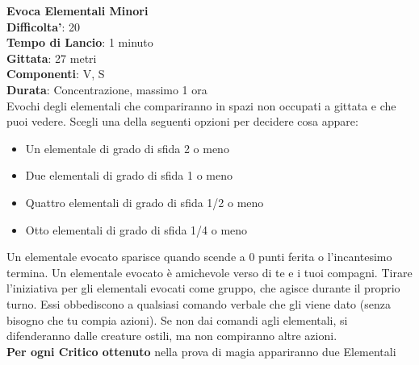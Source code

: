 \begin{multicols}{2}
\medskip\textbf{Evoca Elementali Minori}\\
\textbf{Difficolta'}: 20\\
\textbf{Tempo di Lancio}: 1 minuto\\
\textbf{Gittata}: 27 metri\\
\textbf{Componenti}: V, S\\
\textbf{Durata}: Concentrazione, massimo 1 ora\\
Evochi degli elementali che compariranno in spazi non occupati a gittata e che puoi vedere. Scegli una della seguenti opzioni per decidere cosa appare:
\begin{itemize}
\item Un elementale di grado di sfida 2 o meno
\item Due elementali di grado di sfida 1 o meno
\item Quattro elementali di grado di sfida 1/2 o meno
\item Otto elementali di grado di sfida 1/4 o meno
\end{itemize}
\medskip
Un elementale evocato sparisce quando scende a 0 punti ferita o l’incantesimo termina. Un elementale evocato è amichevole verso di te e i tuoi compagni. Tirare l’iniziativa per gli elementali evocati come gruppo, che agisce durante il proprio turno. Essi obbediscono a qualsiasi comando verbale che gli viene dato (senza bisogno che tu compia azioni). Se non dai comandi agli elementali, si difenderanno dalle creature ostili, ma non compiranno altre azioni.\\
\textbf{Per ogni Critico ottenuto} nella prova di magia appariranno due Elementali


\end{multicols}
